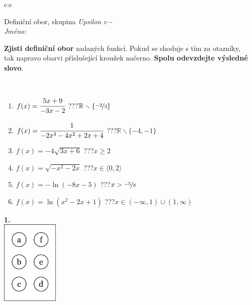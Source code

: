 \documentclass[10pt]{report}
\begin{document}
\begin{tabular}{c:c}
\begin{minipage}[c][104.5mm][t]{0.5\linewidth}
\begin{center}
\vspace{7mm}
{\huge Definiční obor, skupina \textit{Upsilon $\upsilon$} -}\\[5mm]
\textit{Jméno:}\phantom{xxxxxxxxxxxxxxxxxxxxxxxxxxxxxxxxxxxxxxxxxxxxxxxxxxxxxxxxxxxxxxxxx}\\[5mm]
\begin{minipage}{0.95\linewidth}
\begin{center}
\textbf{Zjisti definiční obor} zadaných funkcí. Pokud se shoduje s tím za otazníky,\\tak napravo obarvi příslušející kroužek načerno. \textbf{Spolu odevzdejte výsledné slovo}.
\end{center}
\end{minipage}
\\[1mm]
\begin{minipage}{0.79\linewidth}
\begin{center}
\begin{varwidth}{\linewidth}
\begin{enumerate}
\normalsizerrr
\item $f(x)=\cfrac{5x+9}{-3x-2}$\quad \dotfill\; ???\;\dotfill \quad $\mathbb{R}\smallsetminus\{\nicefrac{-2}{3}\}$
\item $f(x)=\cfrac{1}{-2x^3-4x^2+2x+4}$\quad \dotfill\; ???\;\dotfill \quad $\mathbb{R}\smallsetminus\{-4,-1\}$
\item $f(x)=-4\sqrt{3x+6}$\quad \dotfill\; ???\;\dotfill \quad $x\geq2$
\item $f(x)=\sqrt{-x^2-2x}$\quad \dotfill\; ???\;\dotfill \quad $x\in\langle0 , 2\rangle$
\item $f(x)=-\ln{(-8x-5)}$\quad \dotfill\; ???\;\dotfill \quad $x>\nicefrac{-5}{8}$
\item $f(x)=\ln{(x^2-2x+1)}$\quad \dotfill\; ???\;\dotfill \quad $x\in(-\infty , 1)\cup(1 , \infty)$
\end{enumerate}
\end{varwidth}
\end{center}
\end{minipage}
\begin{minipage}{0.20\linewidth}
\begin{center}
{\Huge\bfseries 1.} \\[2mm]
\includegraphics[height=40mm]{../images/braille.png}

\end{center}
\end{minipage}
\end{center}
\end{minipage}
\end{tabular}
\end{document}
